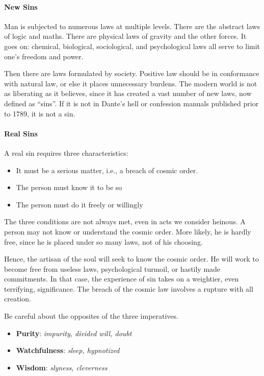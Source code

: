 \paragraph{New Sins}


Man is subjected to numerous laws at multiple levels. There are the abstract laws of logic and maths. There are physical laws of gravity and the other forces. It goes on: chemical, biological, sociological, and psychological laws all serve to limit one's freedom and power.

Then there are laws formulated by society. Positive law should be in conformance with natural law, or else it places unnecessary burdens. The modern world is not as liberating as it believes, since it has created a vast number of new laws, now defined as ``sins''. If it is not in Dante's hell or confession manuals published prior to 1789, it is not a sin.

\paragraph{Real Sins}


A real sin requires three characteristics:

\begin{itemize}


\item It must be a serious matter, i.e., a breach of cosmic order.

\item The person must know it to be so

\item The person must do it freely or willingly
\end{itemize}


The three conditions are not always met, even in acts we consider heinous. A person may not know or understand the cosmic order. More likely, he is hardly free, since he is placed under so many laws, not of his choosing.

Hence, the artisan of the soul will seek to know the cosmic order. He will work to become free from useless laws, psychological turmoil, or hastily made commitments. In that case, the experience of sin takes on a weightier, even terrifying, significance. The breach of the cosmic law involves a rupture with all creation.

Be careful about the opposites of the three imperatives.

\begin{itemize}


\item \textbf{Purity}: \emph{impurity, divided will, doubt}


\item \textbf{Watchfulness}: \emph{sleep, hypnotized}


\item \textbf{Wisdom}: \emph{slyness, cleverness}

\end{itemize}



